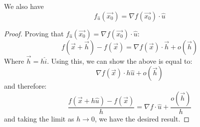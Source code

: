 \begin{itemize}
\begin{definition}
\begin{equation}
		\end{equation}
		We also have
		\begin{equation}
			f_{\hat{u}}\left( \vec{x_0} \right)  = \nabla f\left( \vec{x_0} \right) \cdot \hat{u}
		\end{equation}
	\end{definition}
\begin{proof}
	Proving that $f_{\hat{u}}\left( \vec{x_0} \right)  = \nabla f\left( \vec{x_0} \right) \cdot  \hat{u}$:
	\begin{equation}
		f\left( \vec{x} + \vec{h} \right)  - f\left( \vec{x} \right)  = \nabla f\left( \vec{x} \right) \cdot  \vec{h} + o\left( \vec{h} \right)  
	\end{equation}
	Where $\vec{h} = h\hat{i}$. Using this, we can show the above is equal to:
	\begin{equation}
		\nabla f\left( \vec{x} \right) \cdot h\hat{u} + o\left( \vec{h} \right) 
	\end{equation}
	and therefore:
	\begin{equation}
		\frac{f\left( \vec{x} + h\hat{u} \right)  - f\left( \vec{x} \right) }{h} = \nabla f \cdot  \hat{u} + \frac{o\left( \vec{h} \right) }{h}
	\end{equation}
	and taking the limit as $h\to 0$, we have the desired result.
\end{proof}


\end{itemize}
